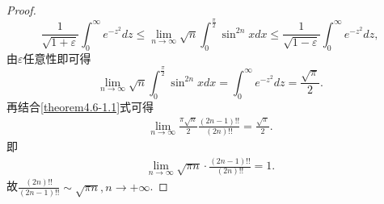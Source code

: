 \documentclass[lang=cn,newtx,10pt,scheme=chinese]{elegantbook}
\begin{document}
\begin{proof}
\[
\frac{1}{\sqrt{1 + \varepsilon}}\int_{0}^{\infty}e^{-z^{2}}dz\leqslant\lim_{n\rightarrow\infty}\sqrt{n}\int_{0}^{\frac{\pi}{2}}\sin^{2n}x dx\leqslant\frac{1}{\sqrt{1 - \varepsilon}}\int_{0}^{\infty}e^{-z^{2}}dz,
\]
由\(\varepsilon\)任意性即可得
\[
\lim_{n\rightarrow\infty}\sqrt{n}\int_{0}^{\frac{\pi}{2}}\sin^{2n}x dx=\int_{0}^{\infty}e^{-z^{2}}dz=\frac{\sqrt{\pi}}{2}.
\]
再结合\eqref{theorem4.6-1.1}式可得
\begin{align*}
   \lim_{n\rightarrow \infty} \frac{\pi \sqrt{n}}{2}\frac{(2n-1)!!}{(2n)!!}=\frac{\sqrt{\pi}}{2}.
\end{align*}
即
\begin{align*}
   \lim_{n\rightarrow \infty} \sqrt{\pi n}\cdot \frac{(2n-1)!!}{(2n)!!}=1.
\end{align*}
故$\frac{(2n)!!}{(2n-1)!!}\sim \sqrt{\pi n},n\rightarrow +\infty $.
\end{proof}
\end{document}
